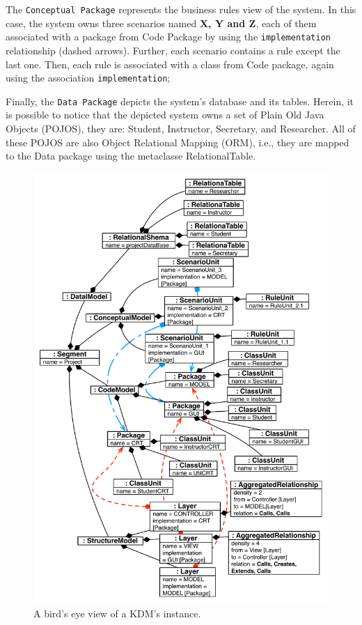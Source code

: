 The \texttt{Conceptual Package} represents the business rules view of the system. In this case, the system owns three scenarios named \textbf{X, Y and Z}, each of them associated with a package from Code Package by using the \texttt{implementation} relationship (dashed arrows). Further, each scenario contains a rule except the last one. Then, each rule is associated with a class from Code package, again using the association \texttt{implementation};

Finally, the \texttt{Data Package} depicts the system's database and its tables. Herein, it is possible to notice that the depicted system owns a set of Plain Old Java Objects (POJOS), they are: Student, Instructor, Secretary, and Researcher. All of these POJOS are also Object Relational Mapping (ORM), i.e., they are mapped to the Data package using the metaclasse RelationalTable. 

\begin{figure}
	\centering
	\includegraphics[scale=0.52]{figuras/TreeNewJoint}
	\caption{A bird's eye view of a KDM's instance.}
	\label{fig:allKDMLayers}
\end{figure}

